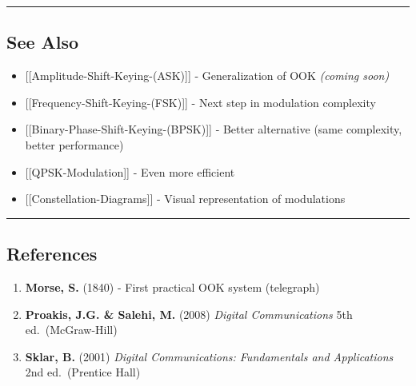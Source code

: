 \begin{center}\rule{0.5\linewidth}{0.5pt}\end{center}

\subsection{\texorpdfstring{ See Also}{ See Also}}\label{see-also}

\begin{itemize}
\tightlist
\item
  {[}{[}Amplitude-Shift-Keying-(ASK){]}{]} - Generalization of OOK
  \emph{(coming soon)}
\item
  {[}{[}Frequency-Shift-Keying-(FSK){]}{]} - Next step in modulation
  complexity
\item
  {[}{[}Binary-Phase-Shift-Keying-(BPSK){]}{]} - Better alternative
  (same complexity, better performance)
\item
  {[}{[}QPSK-Modulation{]}{]} - Even more efficient
\item
  {[}{[}Constellation-Diagrams{]}{]} - Visual representation of
  modulations
\end{itemize}

\begin{center}\rule{0.5\linewidth}{0.5pt}\end{center}

\subsection{\texorpdfstring{ References}{ References}}\label{references}

\begin{enumerate}
\def\labelenumi{\arabic{enumi}.}
\tightlist
\item
  \textbf{Morse, S.} (1840) - First practical OOK system (telegraph)
\item
  \textbf{Proakis, J.G. \& Salehi, M.} (2008) \emph{Digital
  Communications} 5th ed.~(McGraw-Hill)
\item
  \textbf{Sklar, B.} (2001) \emph{Digital Communications: Fundamentals
  and Applications} 2nd ed.~(Prentice Hall)
\end{enumerate}
